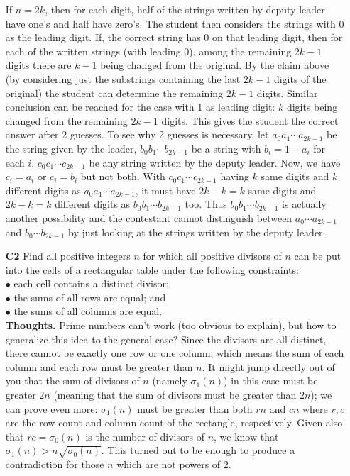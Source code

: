 \documentclass[11pt,a4paper]{article}
\begin{document}
\begin{itemize}
If $n=2k$, then for each digit, half of the strings written by deputy leader have one's and half have zero's. 
The student then considers the strings with 0 as the leading digit. 
If, the correct string has 0 on that leading digit, then for each of the written strings (with leading 0), among the remaining $2k-1$ digits there are $k-1$ being changed from the original. By the claim above (by considering just the substrings containing the last $2k-1$ digits of the original) the student can determine the remaining $2k-1$ digits. 
Similar conclusion can be reached for the case with 1 as leading digit: $k$ digits being changed from the remaining $2k-1$ digits. 
This gives the student the correct answer after 2 guesses. 
To see why 2 guesses is necessary, let $a_0a_1\cdots a_{2k-1}$ be the string given by the leader, $b_0b_1\cdots b_{2k-1}$ be a string with $b_i=1-a_i$ for each $i$, $c_0c_1\cdots c_{2k-1}$ be any string written by the deputy leader. 
Now, we have $c_i=a_i$ or $c_i=b_i$ but not both. 
With $c_0c_1\cdots c_{2k-1}$ having $k$ same digits and $k$ different digits as $a_0a_1\cdots a_{2k-1}$, 
it must have $2k-k=k$ same digits and $2k-k=k$ different digits as $b_0b_1\cdots b_{2k-1}$ too. 
Thus $b_0b_1\cdots b_{2k-1}$ is actually another possibility and the contestant cannot distinguish between $a_0\cdots a_{2k-1}$ and $b_0\cdots b_{2k-1}$ by just looking at the strings written by the deputy leader. 

\newpage
\item[\textbf{C2}]
Find all positive integers $n$ for which all positive divisors of $n$ can be put into the cells of a rectangular table under the following constraints:\\
$\bullet$ each cell contains a distinct divisor;\\
$\bullet$ the sums of all rows are equal; and\\
$\bullet$ the sums of all columns are equal.\\

\textbf{Thoughts.} 
Prime numbers can't work (too obvious to explain), but how to generalize this idea to the general case? 
Since the divisors are all distinct, there cannot be exactly one row or one column, which means the sum of each column and each row must be greater than $n$. 
It might jump directly out of you that the sum of divisors of $n$ (namely $\sigma_1(n)$) in this case must be greater $2n$ (meaning that the sum of divisors must be greater than $2n$); we can prove even more: $\sigma_1(n)$ must be greater than both $rn$ and $cn$ where $r, c$ are the row count and column count of the rectangle, respectively. 
Given also that $rc=\sigma_0(n)$ is the number of divisors of $n$, we know that $\sigma_1(n)>n\sqrt{\sigma_0(n)}$. 
This turned out to be enough to produce a contradiction for those $n$ which are not powers of 2. 


\end{itemize}
\end{document}
